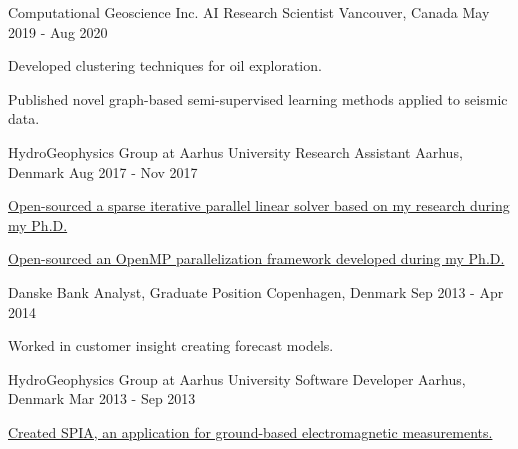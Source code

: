 \begin{cventries}
  \cventry
  {Computational Geoscience Inc.} %
  {AI Research Scientist} %
    {Vancouver, Canada} %
    {May 2019 - Aug 2020} %
    {
      \begin{cvitems} %
        \item {Developed clustering techniques for oil exploration.}
        \item {Published novel graph-based semi-supervised learning methods applied to seismic data.}
      \end{cvitems}
    }

  \cventry
  {HydroGeophysics Group at Aarhus University} %
  {Research Assistant} %
    {Aarhus, Denmark} %
    {Aug 2017 - Nov 2017} %
    {
      \begin{cvitems} %
        \item {\href{https://github.com/tueboesen/Sparse-iterative-parallel-linear-solver}{Open-sourced a sparse iterative parallel linear solver based on my research during my Ph.D.}}
        \item {\href{https://github.com/tueboesen/Parallelization-Framework}{Open-sourced an OpenMP parallelization framework developed during my Ph.D.}}
      \end{cvitems}
    }

  \cventry
  {Danske Bank} %
  {Analyst, Graduate Position} %
    {Copenhagen, Denmark} %
    {Sep 2013 - Apr 2014} %
    {
      \begin{cvitems} %
        \item {Worked in customer insight creating forecast models.}
      \end{cvitems}
    }

  \cventry
  {HydroGeophysics Group at Aarhus University} %
  {Software Developer} %
    {Aarhus, Denmark} %
    {Mar 2013 - Sep 2013} %
    {
      \begin{cvitems} %
        \item {\href{https://hgg.au.dk/software/spia}{Created SPIA, an application for ground-based electromagnetic measurements.}}
      \end{cvitems}
    }


\end{cventries}
